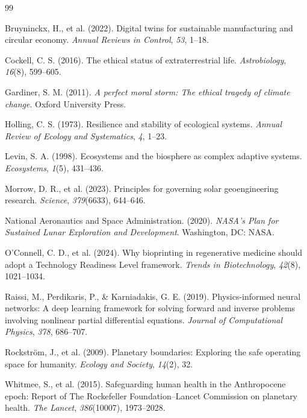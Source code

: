 \documentclass[11pt,a4paper]{article}
\begin{document}
\begin{thebibliography}{99}

Bruyninckx, H., et al. (2022). Digital twins for sustainable manufacturing and circular economy. \textit{Annual Reviews in Control}, \textit{53}, 1--18.

Cockell, C. S. (2016). The ethical status of extraterrestrial life. \textit{Astrobiology}, \textit{16}(8), 599--605.

Gardiner, S. M. (2011). \textit{A perfect moral storm: The ethical tragedy of climate change}. Oxford University Press.

Holling, C. S. (1973). Resilience and stability of ecological systems. \textit{Annual Review of Ecology and Systematics}, \textit{4}, 1--23.

Levin, S. A. (1998). Ecosystems and the biosphere as complex adaptive systems. \textit{Ecosystems}, \textit{1}(5), 431--436.

Morrow, D. R., et al. (2023). Principles for governing solar geoengineering research. \textit{Science}, \textit{379}(6633), 644--646.

National Aeronautics and Space Administration. (2020). \textit{NASA's Plan for Sustained Lunar Exploration and Development}. Washington, DC: NASA.

O'Connell, C. D., et al. (2024). Why bioprinting in regenerative medicine should adopt a Technology Readiness Level framework. \textit{Trends in Biotechnology}, \textit{42}(8), 1021--1034.

Raissi, M., Perdikaris, P., \& Karniadakis, G. E. (2019). Physics-informed neural networks: A deep learning framework for solving forward and inverse problems involving nonlinear partial differential equations. \textit{Journal of Computational Physics}, \textit{378}, 686--707.

Rockström, J., et al. (2009). Planetary boundaries: Exploring the safe operating space for humanity. \textit{Ecology and Society}, \textit{14}(2), 32.

Whitmee, S., et al. (2015). Safeguarding human health in the Anthropocene epoch: Report of The Rockefeller Foundation--Lancet Commission on planetary health. \textit{The Lancet}, \textit{386}(10007), 1973--2028.


\end{thebibliography}
\end{document}
